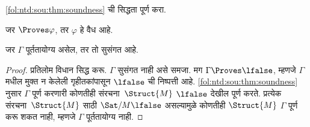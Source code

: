\begin{prob}
\ref{fol:ntd:sou:thm:soundness} ची सिद्धता पूर्ण करा.
\end{prob}
\begin{cor}
\label{fol:ntd:sou:cor:weak-soundness}
जर $\Proves \varphi$, तर $\varphi$ हे वैध आहे.
\end{cor}
\begin{cor}
\label{fol:ntd:sou:cor:consistency-soundness}
जर $\Gamma$ पूर्ततायोग्य असेल, तर तो सुसंगत आहे.
\end{cor}
\begin{proof}
प्रतिलोम विधान सिद्ध करू. $\Gamma$ सुसंगत नाही असे समजा. मग
$\Gamma \Proves \lfalse$, म्हणजे $\Gamma$ मधील मुक्त न केलेली
गृहीतकांपासून $\lfalse$ ची निष्पत्ती आहे. \ref{fol:ntd:sou:thm:soundness}
नुसार $\Gamma$ पूर्ण करणारी कोणतीही
संरचना~$\Struct{M}$
$\lfalse$ देखील पूर्ण करते. प्रत्येक
संरचना~$\Struct{M}$
साठी $\Sat/{M}{\lfalse}$ असल्यामुळे कोणतीही
$\Struct{M}$ $\Gamma$ पूर्ण करू शकत नाही,
म्हणजे $\Gamma$ पूर्ततायोग्य नाही.
\end{proof}

